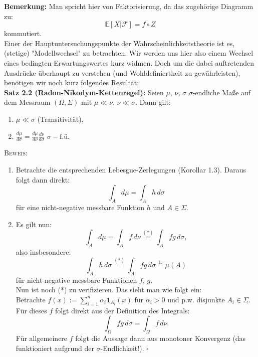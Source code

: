 \documentclass[11pt,english]{smfart}
\newcommand*{\QEDB}{\null\nobreak\hfill\ensuremath{\square}}
\begin{document}
\textbf{Bemerkung:} Man spricht hier von Faktorisierung, da das zugehörige Diagramm zu:
\begin{equation}
    \mathbb{E}[X | \mathcal{F}] = f \circ Z
\end{equation}
kommutiert.\\[0.5cm]

Einer der Hauptuntersuchungspunkte der Wahrscheinlichkeitstheorie ist es, (stetige) "Modellwechsel" zu betrachten. Wir werden uns hier also einem Wechsel eines bedingten Erwartungswertes kurz widmen. Doch um die dabei auftretenden Ausdrücke überhaupt zu verstehen (und Wohldefiniertheit zu gewährleisten), benötigen wir noch kurz folgendes Resultat:\\[0.5cm]
\textbf{Satz 2.2 (Radon-Nikodym-Kettenregel):} Seien \(\mu, \, \nu, \, \sigma\) \(\sigma\)-endliche Maße auf dem Messraum \((\Omega,\Sigma)\) mit \(\mu \ll \nu, \, \nu \ll \sigma\). Dann gilt:
\begin{enumerate}
    \item \(\mu \ll \sigma\) (Transitivität),
    \item \(\frac{d\mu}{d\sigma} = \frac{d\mu}{d\nu} \frac{d\nu}{d\sigma} \, \, \sigma-\text{f.ü.}\)
\end{enumerate}
\textsc{Beweis:} \begin{enumerate}
    \item Betrachte die entsprechenden Lebesgue-Zerlegungen (Korollar 1.3). Daraus folgt dann direkt:
    \begin{equation}
        \int_{A} d\mu = \int_{A} h \,d\sigma
    \end{equation}
    für eine nicht-negative messbare Funktion \(h\) und \(A \in \Sigma\).
    \item Es gilt nun:
    \begin{equation}
        \int_{A} d\mu = \int_{A} f \,d\nu \stackrel{(*)}{=} \int_{A} fg \,d\sigma,
    \end{equation}
    also insbesondere:
    \begin{equation}
        \int_{A} h \,d\sigma \stackrel{(*)}{=} \int_{A} fg \,d\sigma \stackrel{1.}{=} \mu(A)
    \end{equation}
    für nicht-negative messbare Funktionen \(f, \, g\).\\
    Nun ist noch (*) zu verifizieren. Das sieht man wie folgt ein:\\
    Betrachte \(f(x) := \sum_{i=1}^n \alpha_i \textbf{1}_{A_i}(x)\) für \(\alpha_i > 0\) und p.w. disjunkte \(A_i \in \Sigma\). Für dieses \(f\) folgt direkt aus der Definition des Integrals:
    \begin{equation}
        \int_{\Omega} fg \,d\sigma = \int_{\Omega} f \,d\nu.
    \end{equation}
    Für allgemeinere \(f\) folgt die Aussage dann aus monotoner Konvergenz (das funktioniert aufgrund der \(\sigma\)-Endlichkeit!). \QEDB
\end{enumerate}
\end{document}
